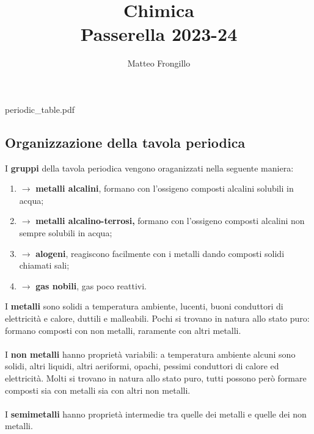\documentclass{article}
\title{\textbf{Chimica \\ Passerella 2023-24}}
\author{Matteo Frongillo}
\begin{document}
\maketitle
\tableofcontents

\begin{center}
    \begin{flushleft}
        
        {periodic_table.pdf}
    \end{flushleft}
\end{center}
\pagebreak

\subsection{Organizzazione della tavola periodica}
I \textbf{gruppi} della tavola periodica vengono oraganizzati nella seguente maniera:
\begin{enumerate}[label=\textbf{\Roman*}]
    \item $\rightarrow$ \textbf{metalli alcalini}, formano con l'ossigeno composti alcalini solubili in acqua;
    \item $\rightarrow$ \textbf{metalli alcalino-terrosi,} formano con l'ossigeno composti alcalini non
        sempre solubili in acqua;
    \item $\rightarrow$ \textbf{alogeni}, reagiscono facilmente con i metalli dando composti solidi chiamati sali;
    \item $\rightarrow$ \textbf{gas nobili}, gas poco reattivi.
\end{enumerate}
\vspace{.5cm}

I \textbf{metalli} sono solidi a temperatura ambiente, lucenti, buoni conduttori di elettricità
e calore, duttili e malleabili. Pochi si trovano in natura allo stato puro:
formano composti con non metalli, raramente con altri metalli.
\\ \\
I \textbf{non metalli} hanno proprietà variabili: a temperatura ambiente alcuni sono solidi,
altri liquidi, altri aeriformi, opachi, pessimi conduttori di calore ed elettricità.
Molti si trovano in natura allo stato puro, tutti possono però formare composti sia con metalli
sia con altri non metalli.
\\ \\
I \textbf{semimetalli} hanno proprietà intermedie tra quelle dei metalli e quelle dei non metalli.
\pagebreak
\end{document}
